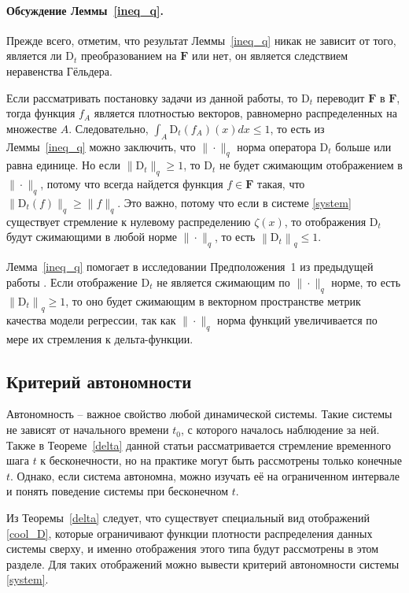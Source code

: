         \paragraph{Обсуждение Леммы~\ref{ineq_q}.} Прежде всего, отметим, что результат Леммы~\ref{ineq_q} никак не зависит от того, является ли $\text{D}_t$ преобразованием на $\textbf{F}$ или нет, он является следствием неравенства Гёльдера.
    
        Если рассматривать постановку задачи из данной работы, то $\text{D}_t$ переводит $\textbf{F}$ в $\textbf{F}$, тогда функция $f_A$ является плотностью векторов, равномерно распределенных на множестве $A$. Следовательно, $\int_{A} \text{D}_t(f_A)(x)dx \leq 1$, то есть из Леммы~\ref{ineq_q} можно заключить, что $\| \cdot \|_q$ норма оператора $\text{D}_t$ больше или равна единице. Но если $\|\text{D}_t\|_q \geq 1$, то $\text{D}_t$ не будет сжимающим отображением в $\|\cdot\|_q$, потому что всегда найдется функция $f \in \textbf{F}$ такая, что $\|\text{D}_t(f)\|_q \geq \|f\|_q$. Это важно, потому что если в системе \eqref{system} существует стремление к нулевому распределению $\zeta(x)$, то отображения $\text{D}_t$ будут сжимающими в любой норме $\| \cdot \|_q$, то есть $\left\|\text{D}_t\right\|_q \leq 1$. 
    
        Лемма~\ref{ineq_q} помогает в исследовании Предположения~1 из предыдущей работы \citep{khritankov2021hidden}. Если отображение $\text{D}_t$ не является сжимающим по $\| \cdot \|_q$ норме, то есть $\left\|\text{D}_t\right\|_q \geq 1$, то оно будет сжимающим в векторном пространстве метрик качества модели регрессии, так как $\| \cdot \|_q$ норма функций увеличивается по мере их стремления к дельта-функции.
    
    \subsection{Критерий автономности}
    
        Автономность -- важное свойство любой динамической системы. Такие системы не зависят от начального времени $t_0$, с которого началось наблюдение за ней. Также в Теореме~\ref{delta} данной статьи рассматривается стремление временного шага $t$ к бесконечности, но на практике могут быть рассмотрены только конечные $t$. Однако, если система автономна, можно изучать её на ограниченном интервале и понять поведение системы при бесконечном $t$.
    
        Из Теоремы~\ref{delta} следует, что существует специальный вид отображений \eqref{cool_D}, которые ограничивают функции плотности распределения данных системы сверху, и именно отображения этого типа будут рассмотрены в этом разделе. Для таких отображений можно вывести критерий автономности системы \eqref{system}.
    
